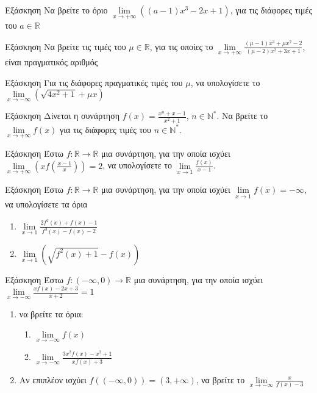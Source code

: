 \documentclass[greek]{beamer}
\begin{document}
\begin{frame}{Εξάσκηση}
 Να βρείτε το όριο $\lim\limits_{x \to +\infty}{ \left( (a-1)x^3-2x+1 \right)  }$, για τις διάφορες τιμές του $a\in\mathbb{R}$
\end{frame}

\begin{frame}{Εξάσκηση}
 Να βρείτε τις τιμές του $μ\in\mathbb{R}$, για τις οποίες το $\lim\limits_{x \to +\infty}{ \frac{(μ-1)x^3+μx^2-2}{(μ-2)x^2+3x+1}  }$, είναι πραγματικός αριθμός
\end{frame}

\begin{frame}{Εξάσκηση}
 Για τις διάφορες πραγματικές τιμές του $μ$, να υπολογίσετε το $\lim\limits_{x \to -\infty}{ \left( \sqrt{4x^2+1}+μx \right)  }$
\end{frame}

\begin{frame}{Εξάσκηση}
 Δίνεται η συνάρτηση $f(x)=\frac{x^n+x-1}{x^2+1}$, $n\in\mathbb{N}^*$. Να βρείτε το $\lim\limits_{x \to +\infty}{ f(x) } $ για τις διάφορες τιμές του $n\in\mathbb{N}^*$.
\end{frame}

\begin{frame}{Εξάσκηση}
 Έστω $f:\mathbb{R}\to\mathbb{R}$ μια συνάρτηση, για την οποία ισχύει $\lim\limits_{x \to +\infty}{ \left( xf\left( \frac{x-1}{x} \right)  \right)  }=2$, να υπολογίσετε το $\lim\limits_{x \to 1}{ \frac{f(x)}{x-1} }$.
\end{frame}

\begin{frame}{Εξάσκηση}
 Έστω $f:\mathbb{R}\to\mathbb{R}$ μια συνάρτηση, για την οποία ισχύει $\lim\limits_{x \to 1}{ f(x)  }=-\infty$, να υπολογίσετε τα όρια
 \begin{enumerate}
  \item $\lim\limits_{x \to 1}{ \frac{2f^2(x)+f(x)-1}{f^3(x)-f(x)-2} }$ \pause
  \item $\lim\limits_{x \to 1}{ \left( \sqrt{f^2(x)+1}-f(x) \right)  }$
 \end{enumerate}
\end{frame}

\begin{frame}{Εξάσκηση}
 Έστω $f:(-\infty,0)\to\mathbb{R}$ μια συνάρτηση, για την οποία ισχύει $\lim\limits_{x \to -\infty}{ \frac{xf(x)-2x+3}{x+2}  }=1$
 \begin{enumerate}
  \item να βρείτε τα όρια:
        \begin{enumerate}
         \item $\lim\limits_{x \to -\infty}{ f(x) }$ \pause
         \item $\lim\limits_{x \to -\infty}{ \frac{3x^2f(x)-x^2+1}{xf(x)+3}  }$
        \end{enumerate}
  \item Αν επιπλέον ισχύει $f\left( (-\infty,0) \right)=(3,+\infty) $, να βρείτε το $\lim\limits_{x \to -\infty}{ \frac{x}{f(x)-3} }$
 \end{enumerate}
\end{frame}
\end{document}
